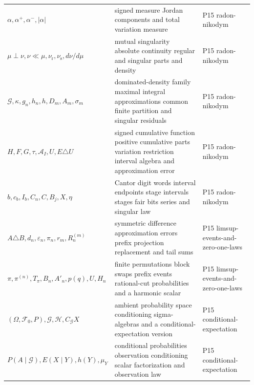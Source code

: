 \begin{longtable}{@{}p{}p{}p{}@{}}
\(\alpha,\allowbreak \alpha^+,\allowbreak \alpha^-,\allowbreak \lvert\alpha\rvert\) & signed measure Jordan components and total variation measure & P15 radon-\allowbreak{}nikodym \\
\(\mu\perp\nu,\allowbreak \nu\ll\mu,\allowbreak \nu_{\mathrm r},\allowbreak \nu_{\mathrm s},\allowbreak d\nu/d\mu\) & mutual singularity absolute continuity regular and singular parts and density & P15 radon-\allowbreak{}nikodym \\
\(\mathcal G,\allowbreak \kappa,\allowbreak g_n,\allowbreak h_n,\allowbreak h,\allowbreak D_m,\allowbreak A_m,\allowbreak \sigma_m\) & dominated-density family maximal integral approximations common finite partition and singular residuals & P15 radon-\allowbreak{}nikodym \\
\(H,\allowbreak F,\allowbreak G,\allowbreak \tau,\allowbreak \mathcal A_I,\allowbreak U,\allowbreak E\triangle U\) & signed cumulative function positive cumulative parts variation restriction interval algebra and approximation error & P15 radon-\allowbreak{}nikodym \\
\(b,\allowbreak c_b,\allowbreak I_b,\allowbreak C_n,\allowbreak C,\allowbreak B_j,\allowbreak X,\allowbreak \eta\) & Cantor digit words interval endpoints stage intervals stages fair bits series and singular law & P15 radon-\allowbreak{}nikodym \\
\(A\triangle B,\allowbreak d_n,\allowbreak \varepsilon_n,\allowbreak \pi_n,\allowbreak r_m,\allowbreak R_n^{(m)}\) & symmetric difference approximation errors prefix projection replacement and tail sums & P15 limsup-\allowbreak{}events-\allowbreak{}and-\allowbreak{}zero-\allowbreak{}one-\allowbreak{}laws \\
\(\pi,\allowbreak \pi^{(n)},\allowbreak T_\pi,\allowbreak B_n,\allowbreak A'_n,\allowbreak p(q),\allowbreak U,\allowbreak H_n\) & finite permutations block swaps prefix events rational-cut probabilities and a harmonic scalar & P15 limsup-\allowbreak{}events-\allowbreak{}and-\allowbreak{}zero-\allowbreak{}one-\allowbreak{}laws \\
\((\Omega,\allowbreak \mathcal F_0,\allowbreak P),\allowbreak \mathcal G,\allowbreak \mathcal H,\allowbreak C_{\mathcal G}X\) & ambient probability space conditioning sigma-algebras and a conditional-expectation version & P15 conditional-\allowbreak{}expectation \\
\(P(A\mid\mathcal G),\allowbreak E(X\mid Y),\allowbreak h(Y),\allowbreak \mu_Y\) & conditional probabilities observation conditioning scalar factorization and observation law & P15 conditional-\allowbreak{}expectation \\

\end{longtable}
